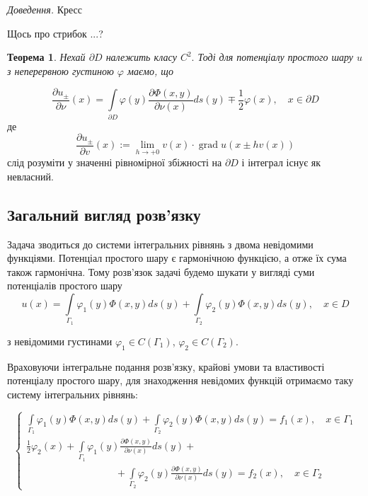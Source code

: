 \documentclass[14pt,a4paper]{extarticle}
\newcounter{e}
\newtheorem{theorem}{Теорема}[section]
\newcommand{\proof}{\textit{Доведення. \space}}
\numberwithin{equation}{section}
\newcommand{\intl}{\int\limits}
\begin{document}
 \proof Кресс
 
 Щось про стрибок ...?
 
 \begin{theorem}
 	\label{potential-partial-derevative}
	 Нехай $\partial D$ належить класу $C^{2} .$ Тоді для потенціалу простого шару $u$ з неперервною густиною $\varphi$ маємо, що
 \end{theorem}
 
 $$
 \frac{\partial u_{\pm}}{\partial \nu}(x) =
 \intl_{\partial D} \varphi(y) \frac{\partial \Phi(x, y)}{\partial \nu(x)} d s(y) \mp \frac{1}{2} \varphi(x),
 \quad x \in \partial D
 $$
 де
 $$
 \frac{\partial u_{\pm}}{\partial v}(x):=\lim _{h \rightarrow+0} v(x) \cdot \operatorname{grad} u(x \pm h v(x))
 $$
 слід розуміти у значенні рівномірної збіжності на $\partial D$ і інтеграл існує як невласний.
 
 \subsection{Загальний вигляд розв'язку}
 
 Задача \boundprob \space зводиться до системи інтегральних рівнянь з двома невідомими функціями.
Потенціал простого шару є гармонічною функцією, а отже їх сума також гармонічна.
Тому розв'язок задачі \boundprob \space будемо шукати у вигляді суми потенціалів простого шару
 \begin{equation}
\label{potentials-sum-solution}
 u(x) 
 = \intl_{\Gamma_1} \varphi_1(y) \Phi(x, y) d s(y)
 + \intl_{\Gamma_2} \varphi_2(y) \Phi(x, y) d s(y)
 , \quad x \in D
 \end{equation}
 
 з невідомими густинами $\varphi_1 \in C(\Gamma_{1}) $, $\varphi_2 \in C(\Gamma_{2})$.
 
 Враховуючи інтегральне подання розв'язку, крайові умови та властивості потенціалу простого шару, для знаходження невідомих функцій отримаємо таку систему інтегральних рівнянь:
 
 \begin{equation}
 	\label{IE-system}
	 \left\{
	 \begin{array}{l}
	 	\displaystyle
	 	  \intl_{\Gamma_{1}} \varphi_1(y) \Phi(x, y) d s(y)
	 	+ \intl_{\Gamma_{2}} \varphi_2(y) \Phi(x, y) d s(y)
	 	= f_{1}(x), \quad x \in \Gamma_{1} 
	 	\\ [1cm]
	 	\displaystyle
	 	\frac{1}{2}\varphi_2(x)
	 	+ \intl_{\Gamma_{1}} \varphi_1(y) \frac{\partial \Phi(x, y)}{\partial \nu(x)} d s(y) +
	 	\\ [0.3cm]
	 	\displaystyle \qquad \qquad \qquad \qquad \quad
	 	+ \intl_{\Gamma_{2}} \varphi_2(y) \frac{\partial \Phi(x, y)}{\partial \nu(x)} d s(y)
	 	= f_{2}(x), \quad x \in \Gamma_{2}
 \end{array}\right.
 \end{equation}
\end{document}
